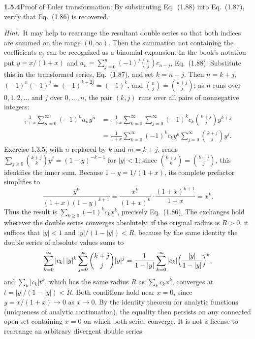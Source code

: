 \par\bigskip
\noindent\textbf{1.5.4}\quad Proof of Euler transformation: By substituting
Eq.~(1.88) into Eq.~(1.87), verify that Eq.~(1.86) is recovered.

\emph{Hint.}~It may help to rearrange the resultant double series so that both
indices are summed on the range $(0,\infty)$. Then the summation not
containing the coefficients $c_{j}$ can be recognized as a binomial expansion.
\solution
In the book's notation put $y=x/(1+x)$ and
$a_n=\sum_{j=0}^n(-1)^j\binom nj c_{n-j}$, Eq.~(1.88). Substitute this
in the transformed series, Eq.~(1.87), and set $k=n-j$. Then $n=k+j$,
$(-1)^n(-1)^j=(-1)^{k+2j}=(-1)^k$, and $\binom nj=\binom{k+j}j$; as $n$
runs over $0,1,2,\ldots$ and $j$ over $0,\ldots,n$, the pair $(k,j)$
runs over all pairs of nonnegative integers:
\[
 \begin{aligned}
 \frac1{1+x}\sum_{n=0}^\infty(-1)^n a_n y^n
 &=\frac1{1+x}\sum_{k=0}^\infty\sum_{j=0}^\infty
       (-1)^k c_k\binom{k+j}j y^{k+j}\\
 &=\frac1{1+x}\sum_{k=0}^\infty(-1)^k c_k y^k
       \sum_{j=0}^\infty\binom{k+j}j y^j.
 \end{aligned}
\]
Exercise 1.3.5, with $n$ replaced by $k$ and $m=k+j$, reads
$\sum_{j\ge0}\binom{k+j}ky^j=(1-y)^{-k-1}$ for $|y|<1$; since
$\binom{k+j}k=\binom{k+j}j$, this identifies the inner sum.
Because $1-y=1/(1+x)$, its complete prefactor simplifies to
\[
 \frac{y^k}{(1+x)(1-y)^{k+1}}
 =\frac{x^k}{(1+x)^k}\cdot\frac{(1+x)^{k+1}}{1+x}=x^k.
\]
Thus the result is $\sum_{k\ge0}(-1)^k c_kx^k$, precisely Eq.~(1.86).
The exchanges hold wherever the double series converges absolutely;
if the original radius is $R>0$, it suffices that
$|y|<1$ and $|y|/(1-|y|)<R$, because by the same identity the double
series of absolute values sums to
\[
 \sum_{k=0}^\infty|c_k|\,|y|^k\sum_{j=0}^\infty\binom{k+j}j|y|^j
 =\frac1{1-|y|}\sum_{k=0}^\infty|c_k|\Bigl(\frac{|y|}{1-|y|}\Bigr)^k,
\]
and $\sum_k|c_k|t^k$, which has the same radius $R$ as
$\sum_kc_kx^k$, converges at $t=|y|/(1-|y|)<R$.
Both conditions hold near $x=0$, since $y=x/(1+x)\to0$ as $x\to0$.
By the identity theorem for analytic functions (uniqueness of analytic
continuation), the equality then persists on any connected open set
containing $x=0$ on which both series converge. It is not a license to
rearrange an arbitrary divergent double series.


